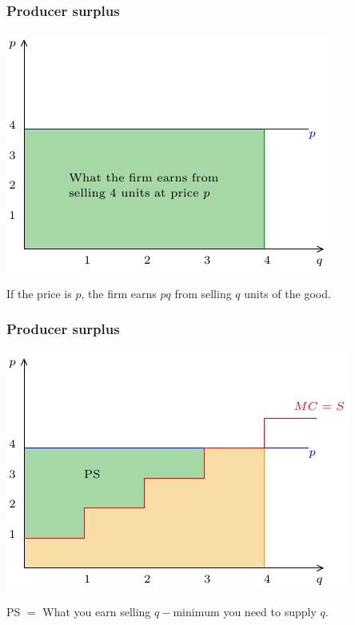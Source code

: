 \documentclass[xcolor=pdftex,dvipsnames]{beamer}
\begin{document}
\begin{frame}
\frametitle{Producer surplus}
\begin{center}
\includegraphics{pics/PS3}
\end{center}
If the price is $p$, the firm earns $pq$ from selling $q$ units of the good.
\end{frame}

\begin{frame}
\frametitle{Producer surplus}
\begin{center}
\includegraphics{pics/PS4}
\end{center}
PS $=$ What you earn selling $q - \text{minimum}$  you need to supply $q$.
\\
\
\end{frame}
\end{document}

